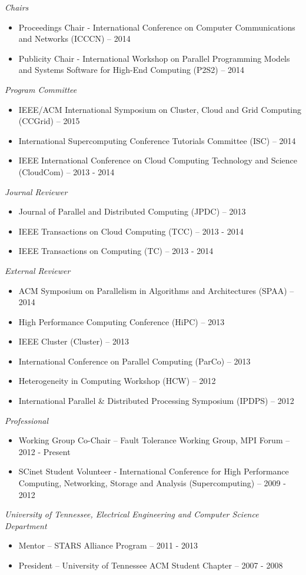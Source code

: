 {\sl Chairs}
\begin{itemize}
    \item Proceedings Chair - International Conference on Computer
        Communications and Networks (ICCCN) -- 2014
    \item Publicity Chair - International Workshop on Parallel Programming
        Models and Systems Software for High-End Computing (P2S2) -- 2014
\end{itemize}

{\sl Program Committee}
\begin{itemize}
    \item IEEE/ACM International Symposium on Cluster, Cloud and Grid
        Computing (CCGrid) -- 2015
    \item International Supercomputing Conference Tutorials Committee (ISC) --
        2014
    \item IEEE International Conference on Cloud Computing Technology and
        Science (CloudCom) -- 2013 - 2014
\end{itemize}

{\sl Journal Reviewer}
\begin{itemize}
    \item Journal of Parallel and Distributed Computing (JPDC) -- 2013
    \item IEEE Transactions on Cloud Computing (TCC) -- 2013 - 2014
    \item IEEE Transactions on Computing (TC) -- 2013 - 2014
\end{itemize}

{\sl External Reviewer}
\begin{itemize}
    \item ACM Symposium on Parallelism in Algorithms and Architectures (SPAA) -- 2014
    \item High Performance Computing Conference (HiPC) -- 2013
    \item IEEE Cluster (Cluster) -- 2013
    \item International Conference on Parallel Computing (ParCo) -- 2013
    \item Heterogeneity in Computing Workshop (HCW) -- 2012
    \item International Parallel \& Distributed Processing Symposium (IPDPS) -- 2012
\end{itemize}

{\sl Professional}
\begin{itemize}
    \item Working Group Co-Chair -- Fault Tolerance Working Group, MPI Forum -- 2012 - Present
    \item SCinet Student Volunteer - International Conference for High
        Performance Computing, Networking, Storage and Analysis
        (Supercomputing) -- 2009 - 2012
\end{itemize}

{\sl University of Tennessee, Electrical Engineering and Computer Science Department}
\begin{itemize}
    \item Mentor -- STARS Alliance Program -- 2011 - 2013
    \item President -- University of Tennessee ACM Student Chapter -- 2007 - 2008
\end{itemize}
